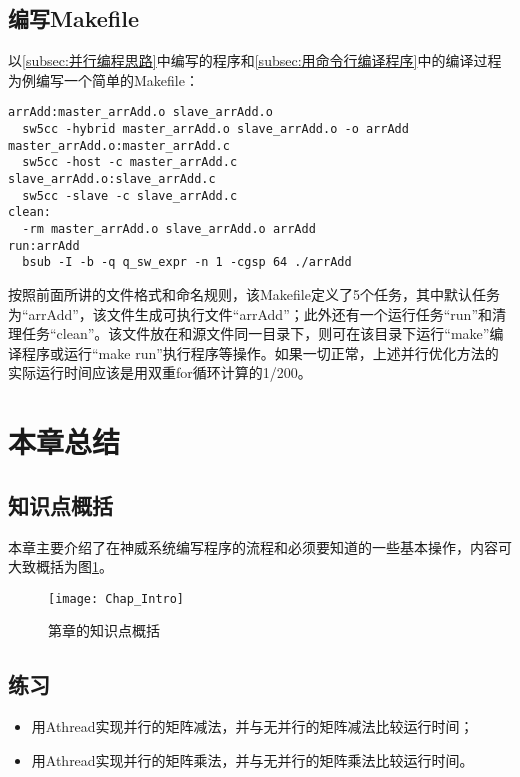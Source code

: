 \subsection{编写Makefile}\label{subsec:编写Makefile}
以\ref{subsec:并行编程思路}中编写的程序和\ref{subsec:用命令行编译程序}中的编译过程为例编写一个简单的Makefile：
\begin{lstlisting}
arrAdd:master_arrAdd.o slave_arrAdd.o
  sw5cc -hybrid master_arrAdd.o slave_arrAdd.o -o arrAdd
master_arrAdd.o:master_arrAdd.c
  sw5cc -host -c master_arrAdd.c
slave_arrAdd.o:slave_arrAdd.c
  sw5cc -slave -c slave_arrAdd.c
clean:
  -rm master_arrAdd.o slave_arrAdd.o arrAdd
run:arrAdd
  bsub -I -b -q q_sw_expr -n 1 -cgsp 64 ./arrAdd
\end{lstlisting}

按照前面所讲的文件格式和命名规则，该Makefile定义了5个任务，其中默认任务为“arrAdd”，该文件生成可执行文件“arrAdd”；此外还有一个运行任务“run”和清理任务“clean”。该文件放在和源文件同一目录下，则可在该目录下运行“make”编译程序或运行“make run”执行程序等操作。如果一切正常，上述并行优化方法的实际运行时间应该是用双重for循环计算的1/200。

\section{本章总结}
\subsection{知识点概括}
本章主要介绍了在神威系统编写程序的流程和必须要知道的一些基本操作，内容可大致概括为图\ref{fig:Chap_Intro}。

\begin{figure}[!htbp]
	\centering
	\texttt{[image: Chap\_Intro]}
	\caption{第\thechapter{}章的知识点概括}
	\label{fig:Chap_Intro}
\end{figure}

\subsection{练习}
\begin{itemize}
	\item 用Athread实现并行的矩阵减法，并与无并行的矩阵减法比较运行时间；
	\item 用Athread实现并行的矩阵乘法，并与无并行的矩阵乘法比较运行时间。
\end{itemize}